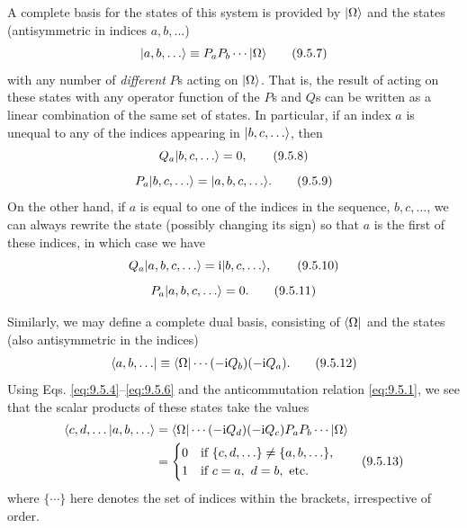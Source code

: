 A complete basis for the states of this system is provided by $\lvert \Omega\rangle$
and the states (antisymmetric in indices $a,b,\ldots$)
\begin{equation}
\lvert a,b,\ldots\rangle\equiv P_aP_b\cdots\lvert \Omega\rangle
\tag{9.5.7}\label{eq:9.5.7}
\end{equation}
with any number of \emph{different} $P$s acting on $\lvert \Omega\rangle$. That is, the
result of acting on these states with any operator function of the $P$s and
$Q$s can be written as a linear combination of the same set of states. In
particular, if an index $a$ is unequal to any of the indices appearing in
$\lvert b,c,\ldots\rangle$, then
\begin{equation}
Q_a\lvert b,c,\ldots\rangle=0,
\tag{9.5.8}\label{eq:9.5.8}
\end{equation}
\begin{equation}
P_a\lvert b,c,\ldots\rangle=\lvert a,b,c,\ldots\rangle.
\tag{9.5.9}\label{eq:9.5.9}
\end{equation}
On the other hand, if $a$ is equal to one of the indices in the sequence,
$b,c,\ldots$, we can always rewrite the state (possibly changing its sign) so
that $a$ is the first of these indices, in which case we have
\begin{equation}
Q_a\lvert a,b,c,\ldots\rangle=\mathrm{i}\lvert b,c,\ldots\rangle,
\tag{9.5.10}\label{eq:9.5.10}
\end{equation}
\begin{equation}
P_a\lvert a,b,c,\ldots\rangle=0.
\tag{9.5.11}\label{eq:9.5.11}
\end{equation}

Similarly, we may define a complete dual basis, consisting of $\langle \Omega\rvert$
and the states (also antisymmetric in the indices)
\begin{equation}
\langle a,b,\ldots\rvert\equiv\langle \Omega\rvert\cdots(-\mathrm{i} Q_b)(-\mathrm{i} Q_a).
\tag{9.5.12}\label{eq:9.5.12}
\end{equation}
Using Eqs. \eqref{eq:9.5.4}--\eqref{eq:9.5.6} and the anticommutation relation \eqref{eq:9.5.1}, we see
that the scalar products of these states take the values
\begin{align}
\langle c,d,\ldots | a,b,\ldots\rangle
&=\langle \Omega\rvert\cdots(-\mathrm{i} Q_d)(-\mathrm{i} Q_c)P_aP_b\cdots\lvert \Omega\rangle\notag\\
&=\begin{cases}
0&\text{if }\{c,d,\ldots\}\ne\{a,b,\ldots\},\\
1&\text{if }c=a,\ d=b,\ \text{etc.}
\end{cases}
\tag{9.5.13}\label{eq:9.5.13}
\end{align}
where $\{\cdots\}$ here denotes the set of indices within the brackets,
irrespective of order.

